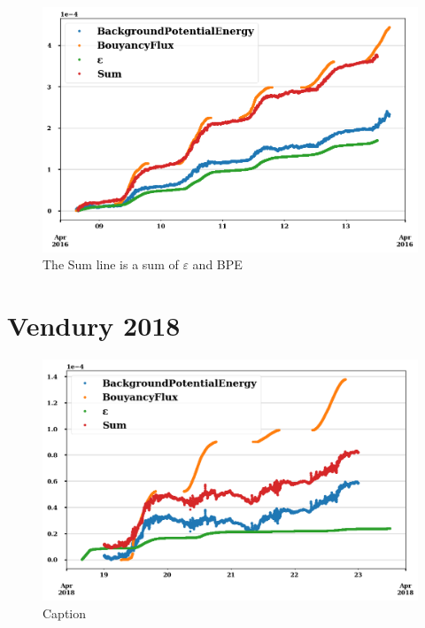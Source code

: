 \documentclass{article}
\begin{document}
\begin{figure}
    \centering
    \includegraphics[width=\textwidth]{vend2016.png}
    \caption{The Sum line is a sum of $\varepsilon$ and BPE}
    \label{fig:my_label}
\end{figure}

\section{Vendury 2018}

\begin{figure}
    \centering
    \includegraphics[width=\textwidth]{vend2018.png}
    \caption{Caption}
    \label{fig:vend2018}
\end{figure}

\printbibliography
\end{document}
